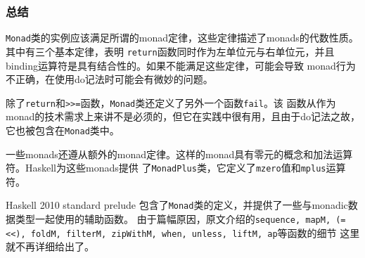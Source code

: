 \subsubsection{总结}
\indent{}\texttt{Monad}类的实例应该满足所谓的monad定律，这些定律描述了monads的代数性质。其中有三个基本定律，表明
\texttt{return}函数同时作为左单位元与右单位元，并且binding运算符是具有结合性的。如果不能满足这些定律，可能会导致
monad行为不正确，在使用do记法时可能会有微妙的问题。

\indent{}除了\texttt{return}和\texttt{>>=}函数，\texttt{Monad}类还定义了另外一个函数\texttt{fail}。该
函数从作为monad的技术需求上来讲不是必须的，但它在实践中很有用，且由于do记法之故，它也被包含在\texttt{Monad}类中。

\indent{}一些monads还遵从额外的monad定律。这样的monad具有零元的概念和加法运算符。Haskell为这些monads提供
了\texttt{MonadPlus}类，它定义了\texttt{mzero}值和\texttt{mplus}运算符。

\indent{}Haskell 2010 standard prelude 包含了\texttt{Monad}类的定义，并提供了一些与monadic数据类型一起使用的辅助函数。
由于篇幅原因，原文介绍的\texttt{sequence, mapM, (=<<), foldM, filterM, zipWithM, when, unless, liftM, ap}等函数的细节
这里就不再详细给出了。
